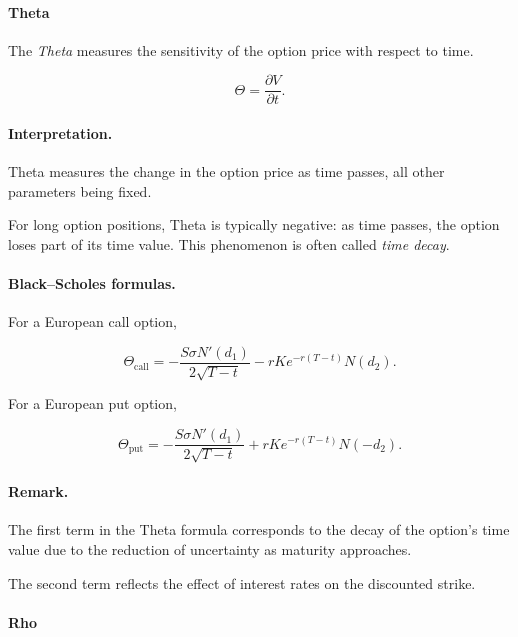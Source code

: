 \documentclass[11pt]{article}
\newcommand{\1}{\mathbf{1}}
\theoremstyle{plain}
\theoremstyle{definition}
\theoremstyle{remark}
\begin{document}
\paragraph{Theta}

The \emph{Theta} measures the sensitivity of the option price with
respect to time.

\[
\Theta = \frac{\partial V}{\partial t}.
\]

\paragraph{Interpretation.}

Theta measures the change in the option price as time passes,
all other parameters being fixed.

For long option positions, Theta is typically negative: as time passes,
the option loses part of its time value.
This phenomenon is often called \emph{time decay}.

\paragraph{Black--Scholes formulas.}

For a European call option,

\[
\Theta_{\text{call}}
=
-
\frac{S\sigma N'(d_1)}{2\sqrt{T-t}}
-
rK e^{-r(T-t)} N(d_2).
\]

For a European put option,

\[
\Theta_{\text{put}}
=
-
\frac{S\sigma N'(d_1)}{2\sqrt{T-t}}
+
rK e^{-r(T-t)} N(-d_2).
\]

\paragraph{Remark.}

The first term in the Theta formula corresponds to the decay of the
option's time value due to the reduction of uncertainty as maturity
approaches.

The second term reflects the effect of interest rates on the discounted
strike.

\paragraph{Rho}
\end{document}

